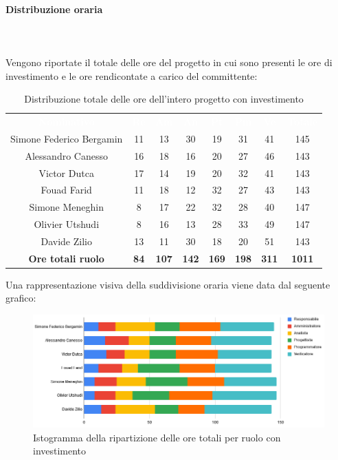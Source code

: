 \paragraph{Distribuzione oraria} \mbox{} \\ \mbox{} \\
Vengono riportate il totale delle ore del progetto in cui sono presenti le ore di investimento e le
ore rendicontate a carico del committente:

\begin{table}[H]
\centering\renewcommand{\arraystretch}{1.5}
\caption{Distribuzione totale delle ore dell'intero progetto con investimento}
\vspace{0.2cm}
\begin{tabular}{ c c c c c c c c }
\rowcolor{redafk}
\textcolor{white}{\textbf{Nominativo}} & \textcolor{white}{\textbf{Re}} & 
\textcolor{white}{\textbf{Am}} & \textcolor{white}{\textbf{An}} &
\textcolor{white}{\textbf{Pt}} & \textcolor{white}{\textbf{Pm}} &
\textcolor{white}{\textbf{Ve}} & \textcolor{white}{\textbf{Totale}} \\
Simone Federico Bergamin 	& 11 	& 13 	& 30 	& 19 	& 31 	& 41 	& 145 \\
Alessandro Canesso 			& 16 	& 18 	& 16 	& 20 	& 27 	& 46 	& 143 \\
Victor Dutca 				& 17	& 14 	& 19 	& 20 	& 32 	& 41 	& 143 \\
Fouad Farid					& 11	& 18 	& 12 	& 32 	& 27 	& 43 	& 143 \\
Simone Meneghin 			& 8 	& 17 	& 22 	& 32 	& 28 	& 40 	& 147 \\
Olivier Utshudi 			& 8 	& 16 	& 13 	& 28 	& 33 	& 49 	& 147 \\
Davide Zilio 				& 13 	& 11 	& 30 	& 18 	& 20 	& 51 	& 143 \\
\rowcolor{lastrowcolor}
\textbf{Ore totali ruolo} & \textbf{84} & \textbf{107} & \textbf{142} & \textbf{169} & \textbf{198} & \textbf{311} & \textbf{1011} \\
\end{tabular}
\end{table}

Una rappresentazione visiva della suddivisione oraria viene data dal seguente grafico:
\begin{figure}[H]
\centering
\includegraphics[scale=0.60]{img/grafici/tabella_tot_con_analisi.png}
\caption{Istogramma della ripartizione delle ore totali per ruolo con investimento}
\end{figure}

